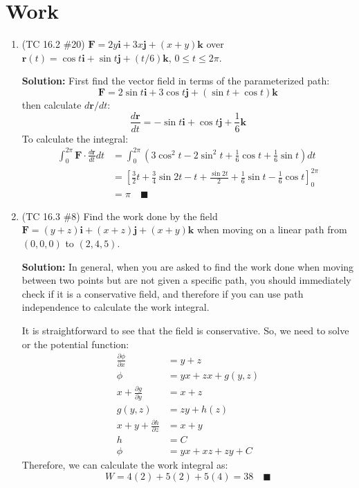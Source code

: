 \documentclass[letterpaper, 11pt]{article}
\begin{document}
\section{Work}
\begin{enumerate}
\item (TC 16.2 \#20) $\bm{F} = 2y\bm{i} + 3x \bm{j} + (x + y)\bm{k}$ over $\bm{r}(t) = \cos t \bm{i} + \sin t \bm{j} + (t/6)\bm{k}$, $0 \leq t \leq 2 \pi$. 

\par \textbf{Solution:} First find the vector field in terms of the parameterized path:
\[ \bm{F} = 2 \sin t \bm{i} + 3 \cos t \bm{j} + (\sin t + \cos t) \bm{k} \]
then calculate $d \bm{r} / dt$:
\[ \frac{d \bm{r}}{dt} = -\sin t \bm{i} + \cos t \bm{j} + \frac{1}{6} \bm{k} \]
To calculate the integral:
\begin{align*}
\int_0^{2 \pi} \bm{F} \cdot  \frac{d \bm{r}}{dt} dt &= \int_0^{2\pi} \left(3 \cos^2 t - 2 \sin^2 t + \frac{1}{6} \cos t + \frac{1}{6} \sin t\right) dt \\
&= \left[ \frac{3}{2} t + \frac{3}{4} \sin 2t - t + \frac{\sin 2t}{2} + \frac{1}{6} \sin t - \frac{1}{6}\cos t \right]_0^{2\pi} \\
&= \pi \quad\blacksquare
\end{align*}


\item (TC 16.3 \#8) Find the work done by the field $\bm{F} = (y + z)\bm{i} + (x + z) \bm{j} + (x + y) \bm{k}$ when moving on a linear path from $(0,0,0)$ to $(2,4,5)$. 

\par \textbf{Solution:} In general, when you are asked to find the work done when moving between two points but are not given a specific path, you should immediately check if it is a conservative field, and therefore if you can use path independence to calculate the work integral. 
\par It is straightforward to see that the field is conservative. So, we need to solve or the potential function:
\begin{align*}
\frac{\partial \phi}{\partial x} &= y +z \\
\phi &= yx + zx + g(y,z) \\
x + \frac{\partial g}{\partial y} &= x + z \\
g(y,z) &= zy + h(z) \\
x + y + \frac{\partial h}{\partial z} &= x + y \\
h &= C \\
\phi &= yx + xz + zy + C 
\end{align*}
Therefore, we can calculate the work integral as:
\[W = 4(2) + 5(2) + 5(4) = 38 \quad\blacksquare \]



\end{enumerate}
\end{document}
